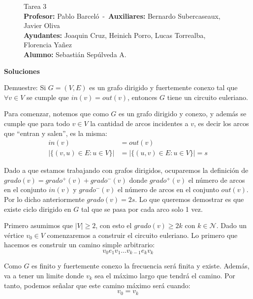 \documentclass[letterpaper,10pt,table, dvipsnames]{article}
\begin{document}
\pagestyle{style2}
\begin{figure}
\centering
\begin{minipage}[c]{0.8\textwidth}
\centering
\vspace{0.3cm}
{\Large Tarea 3}
\vspace{0.3cm}\\
\textbf{Profesor:} Pablo Barceló\ -\ \textbf{Auxiliares:} Bernardo Subercaseaux, Javier Oliva\\
\textbf{Ayudantes:} Joaquin Cruz, Heinich Porro, Lucas Torrealba, Florencia Yañez\\
\textbf{Alumno:} Sebastián Sepúlveda A.
\end{minipage}
\end{figure}

\textbf{{\Large Soluciones}}
\\

\begin{tcolorbox}
 Demuestre: Si $G = (V,E)$ es un grafo dirigido y fuertemente conexo tal que $\forall v \in V$ se cumple que $in(v) = out(v)$, entonces $G$ tiene un circuito euleriano.
\end{tcolorbox}

Para comenzar, notemos que como $G$ es un grafo dirigido y conexo, y además se cumple que para todo $v \in V $ la cantidad de arcos incidentes a $v$, es decir los arcos que ``entran y salen'', es la misma:
\begin{align*}
  in(v) &= out(v) \\
  |\{(v,u) \in E: u \in V \}| &= |\{(u,v) \in E: u \in V \}| = s
\end{align*} 

Dado a que estamos trabajando con grafos dirigidos, ocuparemos la definición de $grado(v)=grado^+ (v)+ grado^- (v)$ donde $grado^+ (v)$ el número de arcos en el conjunto $in(v)$ y $grado^- (v)$ el número de arcos en el conjunto $out(v)$. Por lo dicho anteriormente $grado(v)=2s$. Lo que queremos demostrar es que existe ciclo dirigido en $G$ tal que se pasa por cada arco solo 1 vez. 

Primero asumimos que $|V|\geq 2$, con esto el $grado(v)\geq 2k$ con $k\in \mathcal{N}$. Dado un vértice $v_0 \in V $ comenzaremos a construir el circuito euleriano. Lo primero que hacemos es construir un camino simple arbitrario: $$ v_0 e_1 v_1 \ldots v_{k-1} e_k v_k $$

Como $G$ es finito y fuertemente conexo la frecuencia será finita y existe. Además, va a tener un limite donde $v_k $ sea el máximo largo que tendrá el camino. Por tanto, podemos señalar que este camino máximo será cuando: $$v_0 = v_k$$\\
\end{document}
